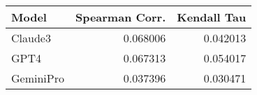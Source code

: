 \begin{tabular}{lrr}
\toprule
Model & Spearman Corr. & Kendall Tau \\
\midrule
Claude3 & 0.068006 & 0.042013 \\
GPT4 & 0.067313 & 0.054017 \\
GeminiPro & 0.037396 & 0.030471 \\
\bottomrule
\end{tabular}
